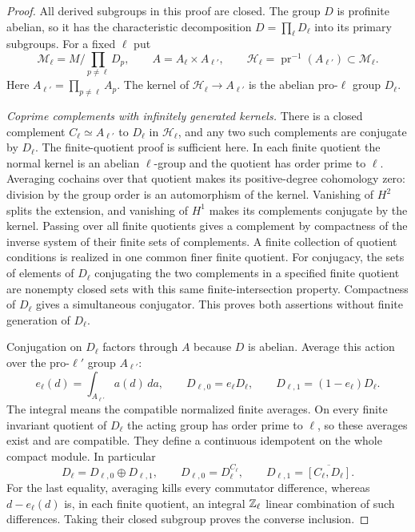 \begin{proof}
All derived subgroups in this proof are closed.  The group $D$ is
profinite abelian, so it has the characteristic decomposition
$D=\prod_\ell D_\ell$ into its primary subgroups.
For a fixed $\ell$ put
\[
 \mathcal M_\ell=M/\prod_{p\ne\ell}D_p,\qquad
 A=A_\ell\times A_{\ell'},\qquad
 \mathcal H_\ell=\operatorname{pr}^{-1}(A_{\ell'})
                                      \subset\mathcal M_\ell .
 \tag{A.71.2}
\]
Here $A_{\ell'}=\prod_{p\ne\ell}A_p$.
The kernel of $\mathcal H_\ell\to A_{\ell'}$ is the abelian
pro-$\ell$ group $D_\ell$.

\emph{Coprime complements with infinitely generated kernels.}
There is a closed complement $C_\ell\simeq A_{\ell'}$ to $D_\ell$
in $\mathcal H_\ell$, and any two such complements are conjugate
by $D_\ell$.  The finite-quotient proof is sufficient here.
In each finite quotient the normal kernel is an abelian
$\ell$-group and the quotient has order prime to $\ell$.
Averaging cochains over that quotient makes its positive-degree
cohomology zero: division by the group order is an automorphism of
the kernel.  Vanishing of $H^2$ splits the extension, and vanishing
of $H^1$ makes its complements conjugate by the kernel.
Passing over all finite quotients gives a complement by compactness
of the inverse system of their finite sets of complements.
A finite collection of quotient conditions is realized in one common
finer finite quotient.  For conjugacy, the sets of elements of
$D_\ell$ conjugating the two complements in a specified finite
quotient are nonempty closed sets with this same finite-intersection
property.  Compactness of $D_\ell$ gives a simultaneous conjugator.
This proves both assertions without finite generation of $D_\ell$.

Conjugation on $D_\ell$ factors through $A$ because $D$ is abelian.
Average this action over the pro-$\ell'$ group $A_{\ell'}$:
\[
 e_\ell(d)=\int_{A_{\ell'}}a(d)\,da,\qquad
 D_{\ell,0}=e_\ell D_\ell,\qquad
 D_{\ell,1}=(1-e_\ell)D_\ell.
 \tag{A.71.3}
\]
The integral means the compatible normalized finite averages.
On every finite invariant quotient of $D_\ell$ the acting group
has order prime to $\ell$, so these averages exist and are compatible.
They define a continuous idempotent on the whole compact module.
In particular
\[
 D_\ell=D_{\ell,0}\oplus D_{\ell,1},\qquad
 D_{\ell,0}=D_\ell^{C_\ell},\qquad
 D_{\ell,1}=\overline{[C_\ell,D_\ell]} .
 \tag{A.71.4}
\]
For the last equality, averaging kills every commutator difference,
whereas $d-e_\ell(d)$ is, in each finite quotient, an integral
$\mathbb Z_\ell$ linear combination of such differences.
Taking their closed subgroup proves the converse inclusion.


\end{proof}
